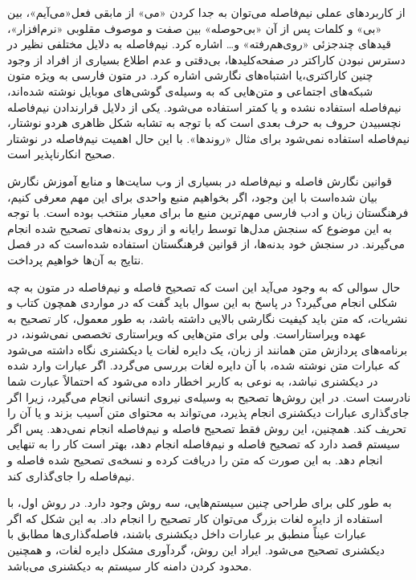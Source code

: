 از کاربرد‌های عملی نیم‌فاصله می‌توان به جدا کردن «می» از مابقی فعل«می‌آیم»، بین «بی» و کلمات پس از آن «بی‌حوصله» بین صفت و موصوف مقلوبی «نرم‌افزار»، قید‌های چند‌جزئی «روی‌هم‌رفته» و… اشاره کرد. نیم‌فاصله به دلایل مختلفی نظیر در دسترس نبودن کاراکتر در صفحه‌کلید‌ها، بی‌دقتی و عدم اطلاع بسیاری از افراد از وجود چنین کاراکتری،یا اشتباه‌های نگارشی اشاره کرد. در متون فارسی به ویژه متون شبکه‌های اجتماعی و متن‌هایی که به وسیله‌ی گوشی‌های موبایل نوشته شده‌اند، نیم‌فاصله استفاده نشده و یا کمتر استفاده می‌شود. یکی از دلایل قرارندادن نیم‌فاصله نچسبیدن حروف به حرف بعدی است که با توجه به  تشابه شکل ظاهری هر‌دو نوشتار، نیم‌فاصله استفاده نمی‌شود برای مثال «روند‌ها». با این حال اهمیت نیم‌فاصله در نوشتار صحیح انکارناپذیر است.

قوانین نگارش فاصله و نیم‌فاصله در بسیاری از وب سایت‌ها و منابع آموزش نگارش بیان شده‌است با این وجود، اگر بخواهیم منبع واحدی برای این مهم معرفی کنیم، فرهنگستان  زبان و ادب فارسی \cite{PersianOrthography2015}مهم‌ترین منبع ما برای معیار منتخب  بوده است. با توجه به این موضوع که سنجش مدل‌ها توسط رایانه و از روی بدنه‌های تصحیح شده انجام می‌گیرند. در سنجش خود بدنه‌ها، از قوانین فرهنگستان استفاده شده‌است که در فصل نتایج به آن‌ها خواهیم پرداخت.

حال سوالی که به وجود می‌آید این است که تصحیح فاصله و نیم‌فاصله در متون به چه شکلی انجام می‌گیرد؟ در پاسخ به این سوال باید گفت که در مواردی همچون کتاب و نشریات، که متن باید کیفیت نگارشی بالایی داشته باشد، به طور معمول، کار تصحیح به عهده ویراستاراست. ولی برای متن‌هایی که ویراستاری تخصصی نمی‌شوند، در برنامه‌های پردازش متن همانند  از زبان، یک دایره لغات یا دیکشنری نگاه داشته می‌شود که عبارات متن نوشته شده، با آن دایره لغات بررسی می‌گردد. اگر عبارات وارد شده در دیکشنری نباشد، به نوعی به کاربر اخطار داده می‌شود که احتمالاً عبارت شما نادرست است. در این روش‌ها تصحیح به وسیله‌ی نیروی انسانی انجام می‌گیرد، زیرا اگر جای‌گذاری عبارات دیکشنری انجام پذیرد، می‌تواند به محتوای متن آسیب بزند و یا آن را تحریف کند. همچنین، این روش فقط تصحیح فاصله و نیم‌فاصله انجام نمی‌دهد. پس اگر سیستم قصد دارد که تصحیح فاصله و نیم‌فاصله انجام دهد، بهتر است کار را به تنهایی انجام دهد. به این صورت که متن را دریافت کرده و نسخه‌ی تصحیح شده فاصله و نیم‌فاصله را جای‌گذاری کند.

به طور کلی برای طراحی چنین سیستم‌هایی، سه روش وجود دارد. در روش اول، با استفاده از دایره لغات بزرگ می‌توان کار تصحیح‌ را انجام داد. به این شکل که اگر عبارات عیناً منطبق بر عبارات داخل دیکشنری باشند، فاصله‌گذاری‌ها مطابق با دیکشنری تصحیح می‌شود. ایراد این روش، گردآوری مشکل دایره لغات، و همچنین محدود کردن دامنه کار سیستم به دیکشنری می‌باشد.

